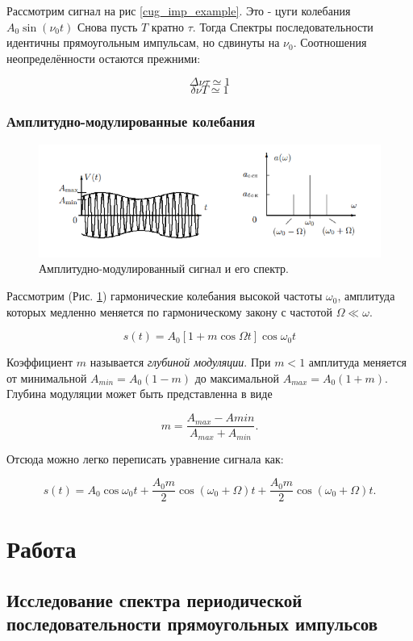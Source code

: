 \documentclass{article}
\begin{document}
Рассмотрим сигнал на рис \ref{cug_imp_example}. Это - цуги колебания \( A_0 \sin \left(\nu_0t\right) \)
Снова пусть $T$ кратно $\tau$. Тогда Спектры последовательности идентичны прямоугольным импульсам, но
сдвинуты на $\nu_0$. Соотношения неопределённости остаются прежними:

\[ \Delta\nu\tau \simeq 1 \]
\[ \delta\nu T \simeq 1 \]

\subsubsection{Амплитудно-модулированные колебания}
\begin{figure}[H]
    \centering
    \includegraphics[width=\textwidth]{AM_signal_example.png}
    \caption{Амплитудно-модулированный сигнал и его спектр.} 
    \label{AM_sig_example}
\end{figure}

Рассмотрим (Рис. \ref{AM_sig_example}) гармонические колебания высокой частоты $\omega_0$, амплитуда которых
медленно меняется по гармоническому закону с частотой $\Omega \ll \omega$.

\[ s(t) = A_0\left[1 + m \cos \Omega t\right] \cos \omega_0 t \]

Коэффициент $m$ называется \emph{глубиной модуляции}. При \( m < 1 \) амплитуда меняется от минимальной 
\( A_{min} = A_0(1 - m) \) до максимальной \( A_{max} = A_0(1 + m) \). Глубина модуляции может быть представленна
в виде

\[ m = \frac{A_{max} - A{min}}{A_{max} + A_{min}}. \]

Отсюда можно легко переписать уравнение сигнала как:

\[ s(t) = A_0 \cos \omega_0t + \frac{A_0m}{2} \cos \left(\omega_0 + \Omega\right)t  + \frac{A_0m}{2} 
\cos \left(\omega_0 + \Omega\right)t.\]

\section{Работа}

\subsection{Исследование спектра периодической последовательности прямоугольных импульсов}
\end{document}
